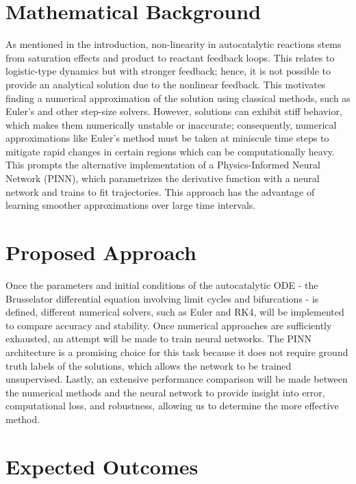 \documentclass[11pt]{article}
\begin{document}
\section{Mathematical Background}
\vspace{-0.2cm}

As mentioned in the introduction, non-linearity in autocatalytic reactions stems from saturation effects and product to reactant feedback loops. This relates to logistic-type dynamics but with stronger feedback; hence, it is not possible to provide an analytical solution due to the nonlinear feedback. This motivates finding a numerical approximation of the solution using classical methods, such as Euler's and other step-size solvers. However, solutions can exhibit stiff behavior, which makes them numerically unstable or inaccurate; consequently, numerical approximations like Euler's method must be taken at miniscule time steps to mitigate rapid changes in certain regions \cite{stiff2022} which can be computationally heavy. This prompts the alternative implementation of a Physics-Informed Neural Network (PINN), which parametrizes the derivative function with a neural network and trains to fit trajectories. This approach has the advantage of learning smoother approximations over large time intervals.

\section{Proposed Approach}
\vspace{-0.2cm}

Once the parameters and initial conditions of the autocatalytic ODE - the Brusselator differential equation involving limit cycles and bifurcations - is defined, different numerical solvers, such as Euler and RK4, will be implemented to compare accuracy and stability. Once numerical approaches are sufficiently exhausted, an attempt will be made to train neural networks. The PINN architecture \cite{cuomo2022} is a promising choice for this task because it does not require ground truth labels of the solutions, which allows the network to be trained unsupervised. Lastly, an extensive performance comparison will be made between the numerical methods and the neural network to provide insight into error, computational loss, and robustness, allowing us to determine the more effective method.

\section{Expected Outcomes}
\vspace{-0.2cm}
\end{document}
